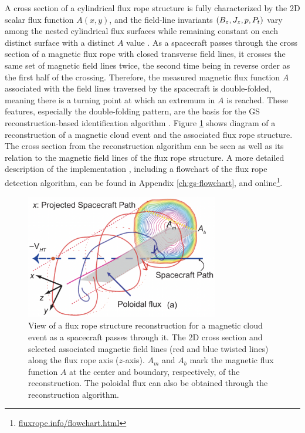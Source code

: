 A cross section of a cylindrical flux rope structure is fully characterized by the 2D scalar flux function $A(x, y)$, and the field-line invariants $\left( B_z,J_z,p, P_t \right)$ vary among the nested cylindrical flux surfaces while remaining constant on each distinct surface with a distinct $A$ value \citep{Hu:2018}. As a spacecraft passes through the cross section of a magnetic flux rope with closed transverse field lines, it crosses the same set of magnetic field lines twice, the second time being in reverse order as the first half of the crossing. Therefore, the measured magnetic flux function $A$ associated with the field lines traversed by the spacecraft is double-folded, meaning there is a turning point at which an extremum in $A$ is reached. These features, especially the double-folding pattern, are the basis for the GS reconstruction-based identification algorithm \citep{Hu:2018}. Figure \ref{fig:GSreconstruction_Hu2017} shows diagram of a reconstruction of a magnetic cloud event and the associated flux rope structure. The cross section from the reconstruction algorithm can be seen as well as its relation to the magnetic field lines of the flux rope structure. A more detailed description of the implementation \citep{Hu:2018}, including a flowchart of the flux rope detection algorithm, can be found in Appendix \ref{ch:gs-flowchart}, and online\footnote{\url{fluxrope.info/flowchart.html}}.

\begin{figure}
    \centering
    \includegraphics[width=0.75\textwidth]{Figures/Hu2017_5a.png}
    \caption[2D cross section view of a flux rope structure reconstruction] {View of a flux rope structure reconstruction for a magnetic cloud event \citep{Hu:2015} as a spacecraft passes through it. The 2D cross section and selected associated magnetic field lines (red and blue twisted lines) along the flux rope axis ($z$-axis). $A_m$ and $A_b$ mark the magnetic flux function $A$ at the center and boundary, respectively, of the reconstruction. The poloidal flux can also be obtained through the reconstruction algorithm.} %
    \label{fig:GSreconstruction_Hu2017}
\end{figure}

